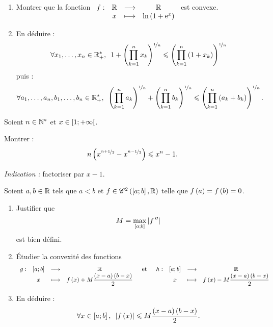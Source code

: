 \begin{exo}[Exercice 20]
\begin{enumerate}
\item Montrer que la fonction \(\begin{array}[t]{cccc}f : & \mathbb{R} & \longrightarrow & \mathbb{R} \\ & x & \longmapsto & \ln\left(1+\mathrm{e}^{x}\right)\end{array}\) est convexe. \\

\item En déduire : \[\quantifs{\forall x_1,\dots,x_n\in\Rps}1+\paren{\prod_{k=1}^nx_k}^{\nicefrac{1}{n}}\leq\paren{\prod_{k=1}^n\paren{1+x_k}}^{\nicefrac{1}{n}}\] puis : \[\quantifs{\forall a_1,\dots,a_n,b_1,\dots,b_n\in\Rps}\paren{\prod_{k=1}^na_k}^{\nicefrac{1}{n}}+\paren{\prod_{k=1}^nb_k}^{\nicefrac{1}{n}}\leq\paren{\prod_{k=1}^n\paren{a_k+b_k}}^{\nicefrac{1}{n}}.\]
\end{enumerate}
\end{exo}

\begin{corr}
\end{corr}

\begin{exo}[Exercice 21]
Soient \(n\in\mathbb{N}^*\) et \(x\in\left[1;+\infty\right[\).

Montrer : \[n\left(x^{\nicefrac{n+1}{2}}-x^{\nicefrac{n-1}{2}}\right)\leqslant x^n-1.\]

\textit{Indication :} factoriser par \(x-1\).
\end{exo}

\begin{corr}
\end{corr}

\begin{exo}[Exercice 22]
Soient \(a,b\in\mathbb{R}\) tels que \(a<b\) et \(f\in\mathscr{C}^{2}\left(\left[a;b\right],\mathbb{R}\right)\) telle que \(f\left(a\right)=f\left(b\right)=0\).

\begin{enumerate}
\item Justifier que \[M=\max_{\left[a;b\right]}\left\lvert f^{\,\prime\prime}\right\rvert\] est bien défini. \\

\item Étudier la convexité des fonctions \[\begin{array}[t]{cccc}g : & \left[a;b\right] & \longrightarrow & \mathbb{R} \\ & x & \longmapsto & f\left(x\right)+M\dfrac{\left(x-a\right)\left(b-x\right)}{2}\end{array}\quad\text{et}\quad\begin{array}[t]{cccc}h : & \left[a;b\right] & \longrightarrow & \mathbb{R} \\ & x & \longmapsto & f\left(x\right)-M\dfrac{\left(x-a\right)\left(b-x\right)}{2}\end{array}\]

\item En déduire : \[\quantifs{\forall x\in\intervii{a}{b}}\abs{f\paren{x}}\leq M\dfrac{\paren{x-a}\paren{b-x}}{2}.\]
\end{enumerate}
\end{exo}

